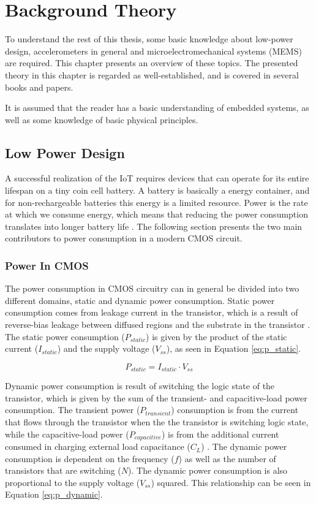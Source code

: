 \chapter{Background Theory}
\label{chap:theory}

To understand the rest of this thesis, some basic knowledge about low-power design, accelerometers in general and microelectromechanical systems (MEMS) are required. This chapter presents an overview of these topics. The presented theory in this chapter is regarded as well-established, and is covered in several books and papers.

It is assumed that the reader has a basic understanding of embedded systems, as well as some knowledge of basic physical principles. 

\section{Low Power Design}

A successful realization of the IoT requires devices that can operate for its entire lifespan on a tiny coin cell battery. A battery is basically a energy container, and for non-rechargeable batteries this energy is a limited resource. Power is the rate at which we consume energy, which means that reducing the power consumption translates into longer battery life \cite[~p.3]{holberg06}. The following section presents the two main contributors to power consumption in a modern CMOS circuit. 

\subsection{Power In CMOS}
\label{sec:cmos_power}

The power consumption in CMOS circuitry can in general be divided into two different domains, static and dynamic power consumption. Static power consumption comes from leakage current in the transistor, which is a result of reverse-bias leakage between diffused regions and the
substrate in the transistor \cite{static_dynamic_power}. The static power consumption ($P_{static}$) is given by the product of the static current ($I_{static}$) and the supply voltage ($V_{ss}$), as seen in Equation \ref{eq:p_static}. 

\begin{equation}
P_{static} = I_{static} \cdot V_{ss}
\label{eq:p_static}
\end{equation}

Dynamic power consumption is result of switching the logic state of the transistor, which is given by the sum of the transient- and capacitive-load power consumption. The transient power ($P_{transient}$) consumption is from the current that flows through the transistor when the the transistor is switching logic state, while the capacitive-load power ($P_{capacitive}$) is from the additional current consumed in charging external load capacitance ($C_{L}$) \cite{cmos_power_consumption}. The dynamic power consumption is dependent on the frequency ($f$) as well as the number of transistors that are switching ($N$). The dynamic power consumption is also proportional to the supply voltage ($V_{ss}$) squared. This relationship can be seen in Equation \ref{eq:p_dynamic}.

